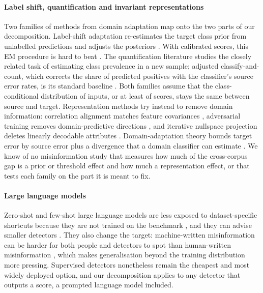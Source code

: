 \paragraph{Label shift, quantification and invariant representations}
Two families of methods from domain adaptation map onto the two parts of our decomposition. Label-shift adaptation re-estimates the target class prior from unlabelled predictions and adjusts the posteriors \citep{saerens2002adjusting,lipton2018bbse}. With calibrated scores, this EM procedure is hard to beat \citep{alexandari2020labelshift}. The quantification literature studies the closely related task of estimating class prevalence in a new sample; adjusted classify-and-count, which corrects the share of predicted positives with the classifier's source error rates, is its standard baseline \citep{forman2008quantifying}. Both families assume that the class-conditional distribution of inputs, or at least of scores, stays the same between source and target. Representation methods try instead to remove domain information: correlation alignment matches feature covariances \citep{sun2016coral}, adversarial training removes domain-predictive directions \citep{ganin2016dann}, and iterative nullspace projection deletes linearly decodable attributes \citep{ravfogel2020inlp}. Domain-adaptation theory bounds target error by source error plus a divergence that a domain classifier can estimate \citep{bendavid2010theory}. We know of no misinformation study that measures how much of the cross-corpus gap is a prior or threshold effect and how much a representation effect, or that tests each family on the part it is meant to fix.

\paragraph{Large language models}
Zero-shot and few-shot large language models are less exposed to dataset-specific shortcuts because they are not trained on the benchmark \citep{pelrine2023gpt4,thibault2025guide,delloglio2026comparison}, and they can advise smaller detectors \citep{hu2024badactor}. They also change the target: machine-written misinformation can be harder for both people and detectors to spot than human-written misinformation \citep{chen2024llmmisinfo}, which makes generalisation beyond the training distribution more pressing. Supervised detectors nonetheless remain the cheapest and most widely deployed option, and our decomposition applies to any detector that outputs a score, a prompted language model included.

